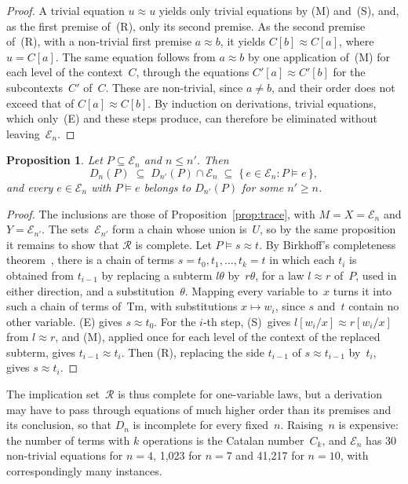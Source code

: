 \documentclass[11pt,a4paper]{article}
\newtheorem{proposition}{Proposition}
\theoremstyle{definition}
\theoremstyle{remark}
\begin{document}
\begin{proof}
A trivial equation $u \approx u$ yields only trivial equations by (M) and~(S), and, as the first premise of~(R), only its second premise. As the second premise of~(R), with a non-trivial first premise $a \approx b$, it yields $C[b] \approx C[a]$, where $u = C[a]$. The same equation follows from $a \approx b$ by one application of~(M) for each level of the context~$C$, through the equations $C'[a] \approx C'[b]$ for the subcontexts~$C'$ of~$C$. These are non-trivial, since $a \ne b$, and their order does not exceed that of $C[a] \approx C[b]$. By induction on derivations, trivial equations, which only~(E) and these steps produce, can therefore be eliminated without leaving~$\mathcal{E}_n$.
\end{proof}

\begin{proposition}\label{prop:bounded}
Let $P \subseteq \mathcal{E}_n$ and $n \le n'$. Then
\[
  D_n(P) \;\subseteq\; D_{n'}(P) \cap \mathcal{E}_n \;\subseteq\; \{\, e \in \mathcal{E}_n : P \models e \,\},
\]
and every $e \in \mathcal{E}_n$ with $P \models e$ belongs to $D_{n'}(P)$ for some $n' \ge n$.
\end{proposition}

\begin{proof}
The inclusions are those of Proposition~\ref{prop:trace}, with $M = X = \mathcal{E}_n$ and $Y = \mathcal{E}_{n'}$. The sets~$\mathcal{E}_{n'}$ form a chain whose union is~$U$, so by the same proposition it remains to show that $\mathcal{R}$ is complete. Let $P \models s \approx t$. By Birkhoff's completeness theorem~\cite[Chapter~3]{BN98}, there is a chain of terms $s = t_0, t_1, \dots, t_k = t$ in which each $t_i$ is obtained from $t_{i-1}$ by replacing a subterm $l\theta$ by~$r\theta$, for a law $l \approx r$ of~$P$, used in either direction, and a substitution~$\theta$. Mapping every variable to~$x$ turns it into such a chain of terms of~$\mathrm{Tm}$, with substitutions $x \mapsto w_i$, since $s$ and~$t$ contain no other variable. (E) gives $s \approx t_0$. For the $i$-th step, (S)~gives $l[w_i/x] \approx r[w_i/x]$ from $l \approx r$, and (M), applied once for each level of the context of the replaced subterm, gives $t_{i-1} \approx t_i$. Then (R), replacing the side $t_{i-1}$ of $s \approx t_{i-1}$ by~$t_i$, gives $s \approx t_i$.
\end{proof}

The implication set~$\mathcal{R}$ is thus complete for one-variable laws, but a derivation may have to pass through equations of much higher order than its premises and its conclusion, so that $D_n$ is incomplete for every fixed~$n$. Raising~$n$ is expensive: the number of terms with $k$ operations is the Catalan number~$C_k$, and $\mathcal{E}_n$ has 30 non-trivial equations for $n = 4$, 1,023 for $n = 7$ and 41,217 for $n = 10$, with correspondingly many instances.
\end{document}
